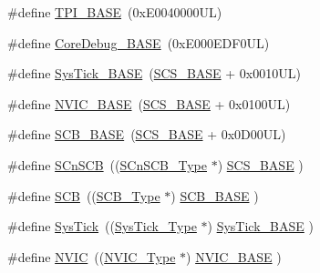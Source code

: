 \begin{DoxyCompactItemize}
\item 
\#define \mbox{\hyperlink{group___c_m_s_i_s__core__base_ga2b1eeff850a7e418844ca847145a1a68}{T\+P\+I\+\_\+\+B\+A\+SE}}~(0x\+E0040000\+U\+L)
\item 
\#define \mbox{\hyperlink{group___c_m_s_i_s__core__base_ga680604dbcda9e9b31a1639fcffe5230b}{Core\+Debug\+\_\+\+B\+A\+SE}}~(0x\+E000\+E\+D\+F0\+U\+L)
\item 
\#define \mbox{\hyperlink{group___c_m_s_i_s__core__base_ga58effaac0b93006b756d33209e814646}{Sys\+Tick\+\_\+\+B\+A\+SE}}~(\mbox{\hyperlink{group___c_m_s_i_s__core__base_ga3c14ed93192c8d9143322bbf77ebf770}{S\+C\+S\+\_\+\+B\+A\+SE}} +  0x0010\+U\+L)
\item 
\#define \mbox{\hyperlink{group___c_m_s_i_s__core__base_gaa0288691785a5f868238e0468b39523d}{N\+V\+I\+C\+\_\+\+B\+A\+SE}}~(\mbox{\hyperlink{group___c_m_s_i_s__core__base_ga3c14ed93192c8d9143322bbf77ebf770}{S\+C\+S\+\_\+\+B\+A\+SE}} +  0x0100\+U\+L)
\item 
\#define \mbox{\hyperlink{group___c_m_s_i_s__core__base_gad55a7ddb8d4b2398b0c1cfec76c0d9fd}{S\+C\+B\+\_\+\+B\+A\+SE}}~(\mbox{\hyperlink{group___c_m_s_i_s__core__base_ga3c14ed93192c8d9143322bbf77ebf770}{S\+C\+S\+\_\+\+B\+A\+SE}} +  0x0\+D00\+U\+L)
\item 
\#define \mbox{\hyperlink{group___c_m_s_i_s__core__base_ga9fe0cd2eef83a8adad94490d9ecca63f}{S\+Cn\+S\+CB}}~((\mbox{\hyperlink{struct_s_cn_s_c_b___type}{S\+Cn\+S\+C\+B\+\_\+\+Type}}    $\ast$)     \mbox{\hyperlink{group___c_m_s_i_s__core__base_ga3c14ed93192c8d9143322bbf77ebf770}{S\+C\+S\+\_\+\+B\+A\+SE}}      )
\item 
\#define \mbox{\hyperlink{group___c_m_s_i_s__core__base_gaaaf6477c2bde2f00f99e3c2fd1060b01}{S\+CB}}~((\mbox{\hyperlink{struct_s_c_b___type}{S\+C\+B\+\_\+\+Type}}       $\ast$)     \mbox{\hyperlink{group___c_m_s_i_s__core__base_gad55a7ddb8d4b2398b0c1cfec76c0d9fd}{S\+C\+B\+\_\+\+B\+A\+SE}}      )
\item 
\#define \mbox{\hyperlink{group___c_m_s_i_s__core__base_gacd96c53beeaff8f603fcda425eb295de}{Sys\+Tick}}~((\mbox{\hyperlink{struct_sys_tick___type}{Sys\+Tick\+\_\+\+Type}}   $\ast$)     \mbox{\hyperlink{group___c_m_s_i_s__core__base_ga58effaac0b93006b756d33209e814646}{Sys\+Tick\+\_\+\+B\+A\+SE}}  )
\item 
\#define \mbox{\hyperlink{group___c_m_s_i_s__core__base_gac8e97e8ce56ae9f57da1363a937f8a17}{N\+V\+IC}}~((\mbox{\hyperlink{struct_n_v_i_c___type}{N\+V\+I\+C\+\_\+\+Type}}      $\ast$)     \mbox{\hyperlink{group___c_m_s_i_s__core__base_gaa0288691785a5f868238e0468b39523d}{N\+V\+I\+C\+\_\+\+B\+A\+SE}}     )

\end{DoxyCompactItemize}
